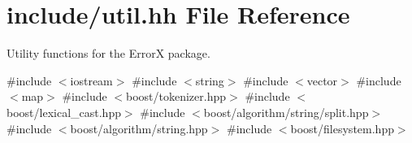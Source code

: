 \hypertarget{util_8hh}{}\section{include/util.hh File Reference}
\label{util_8hh}


Utility functions for the ErrorX package.  


{\ttfamily \#include $<$iostream$>$}\newline
{\ttfamily \#include $<$string$>$}\newline
{\ttfamily \#include $<$vector$>$}\newline
{\ttfamily \#include $<$map$>$}\newline
{\ttfamily \#include $<$boost/tokenizer.\+hpp$>$}\newline
{\ttfamily \#include $<$boost/lexical\+\_\+cast.\+hpp$>$}\newline
{\ttfamily \#include $<$boost/algorithm/string/split.\+hpp$>$}\newline
{\ttfamily \#include $<$boost/algorithm/string.\+hpp$>$}\newline
{\ttfamily \#include $<$boost/filesystem.\+hpp$>$}\newline
